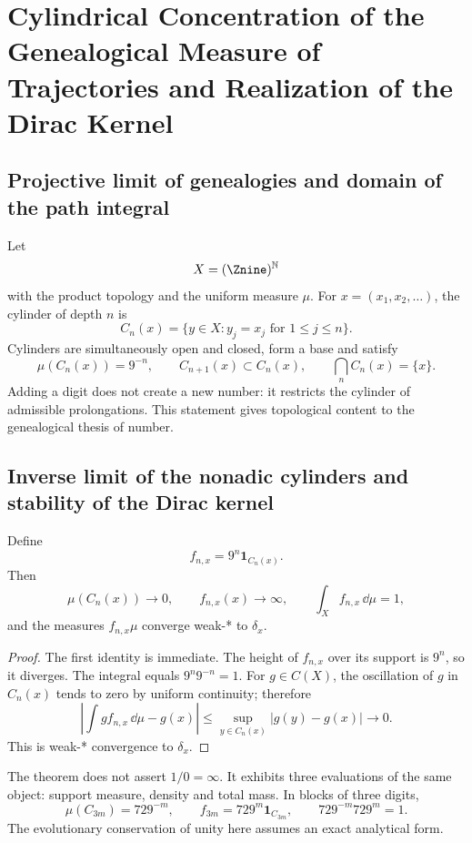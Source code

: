 \chapter{Cylindrical Concentration of the Genealogical Measure of Trajectories and Realization of the Dirac Kernel}

\section{Projective limit of genealogies and domain of the path integral}

Let
\[
X=(\Znine)^{\mathbb N}
\]
with the product topology and the uniform measure \(\mu\). For
\(x=(x_1,x_2,\ldots)\), the cylinder of depth \(n\) is
\[
C_n(x)=\{y\in X:y_j=x_j\text{ for }1\le j\le n\}.
\]
Cylinders are simultaneously open and closed, form a base and
satisfy
\[
\mu(C_n(x))=9^{-n},\qquad
C_{n+1}(x)\subset C_n(x),\qquad
\bigcap_n C_n(x)=\{x\}.
\]
Adding a digit does not create a new number: it restricts the cylinder of
admissible prolongations. This statement gives topological content to the
genealogical thesis of number.

\section{Inverse limit of the nonadic cylinders and stability of the Dirac kernel}

\begin{theorem}
Define
\[
f_{n,x}=9^n\mathbf1_{C_n(x)}.
\]
Then
\[
\mu(C_n(x))\to0,\qquad f_{n,x}(x)\to\infty,\qquad
\int_Xf_{n,x}\,\dd\mu=1,
\]
and the measures \(f_{n,x}\mu\) converge weak-* to \(\delta_x\).
\end{theorem}

\begin{proof}
The first identity is immediate. The height of \(f_{n,x}\) over its support
is \(9^n\), so it diverges. The integral equals
\(9^n9^{-n}=1\). For \(g\in C(X)\), the oscillation of \(g\) in \(C_n(x)\)
tends to zero by uniform continuity; therefore
\[
\left|\int g f_{n,x}\,\dd\mu-g(x)\right|
\le \sup_{y\in C_n(x)}|g(y)-g(x)|\longrightarrow0.
\]
This is weak-* convergence to \(\delta_x\).
\end{proof}

The theorem does not assert \(1/0=\infty\). It exhibits three evaluations of the same
object: support measure, density and total mass. In blocks of three digits,
\[
\mu(C_{3m})=729^{-m},\qquad
f_{3m}=729^m\mathbf1_{C_{3m}},\qquad
729^{-m}729^m=1.
\]
The evolutionary conservation of unity here assumes an exact analytical form.

